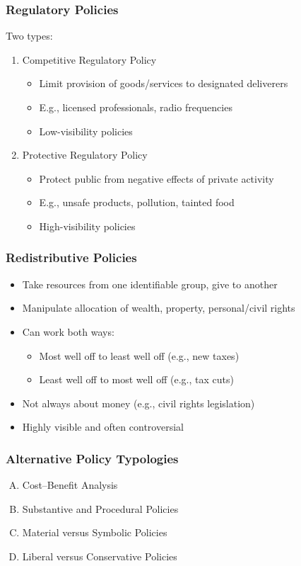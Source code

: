 \documentclass{beamer}
\begin{document}
\begin{frame}
\frametitle{Regulatory Policies}
Two types:
\begin{enumerate}
    \item Competitive Regulatory Policy
    \begin{itemize}
        \item Limit provision of goods/services to designated deliverers
        \item E.g., licensed professionals, radio frequencies
        \item Low-visibility policies
    \end{itemize}
    \item Protective Regulatory Policy
    \begin{itemize}
        \item Protect public from negative effects of private activity
        \item E.g., unsafe products, pollution, tainted food
        \item High-visibility policies
    \end{itemize}
\end{enumerate}
\end{frame}

\begin{frame}
\frametitle{Redistributive Policies}
\begin{itemize}
    \item Take resources from one identifiable group, give to another
    \item Manipulate allocation of wealth, property, personal/civil rights
    \item Can work both ways:
    \begin{itemize}
        \item Most well off to least well off (e.g., new taxes)
        \item Least well off to most well off (e.g., tax cuts)
    \end{itemize}
    \item Not always about money (e.g., civil rights legislation)
    \item Highly visible and often controversial
\end{itemize}
\end{frame}

\begin{frame}
\frametitle{Alternative Policy Typologies}
\begin{enumerate}[A.]
    \item Cost--Benefit Analysis
    \item Substantive and Procedural Policies
    \item Material versus Symbolic Policies
    \item Liberal versus Conservative Policies
\end{enumerate}
\end{frame}
\end{document}
